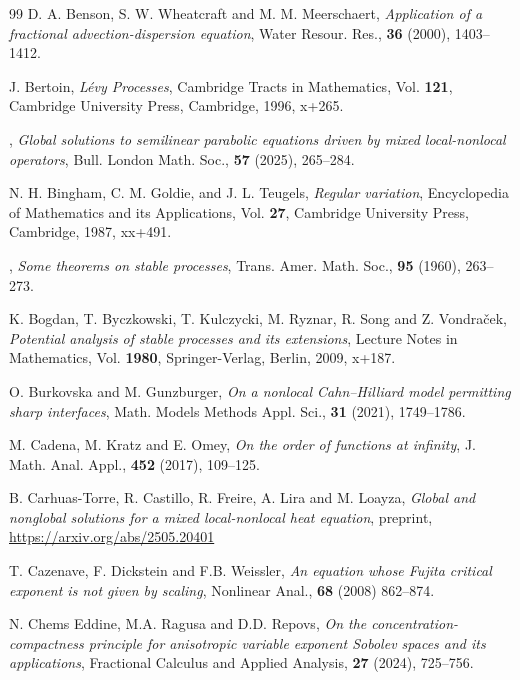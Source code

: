 \documentclass[12pt,reqno]{amsart}
\theoremstyle{plain}
\theoremstyle{definition}
\theoremstyle{remark}
\numberwithin{equation}{section}
\begin{document}
\begin{thebibliography}{99}
 D. A. Benson, S. W. Wheatcraft and M. M. Meerschaert, {\em Application of a fractional advection-dispersion equation}, Water Resour. Res., {\bf 36} (2000), 1403--1412. 

J. Bertoin, {\em Lévy Processes}, {Cambridge Tracts in Mathematics}, Vol. {\bf 121}, {Cambridge University Press, Cambridge}, {1996}, {x+265}.

, {\em Global solutions to semilinear parabolic equations driven by mixed local-nonlocal operators}, Bull. London Math. Soc., {\bf 57} (2025), 265--284. 

 {N. H. Bingham,  C. M. Goldie,  and J. L. Teugels}, {\em Regular variation}, {Encyclopedia of Mathematics and its Applications}, Vol. {\bf 27}, {Cambridge University Press, Cambridge}, {1987}, {xx+491}.

,
     {\em Some theorems on stable processes}, {Trans. Amer. Math. Soc.}, {\bf 95} (1960), {263--273}.

K. Bogdan, T. Byczkowski, T. Kulczycki, M. Ryznar, R. Song and Z. Vondraček, {\em Potential analysis of stable processes and its extensions}, {Lecture Notes in Mathematics}, Vol. {\bf 1980}, {Springer-Verlag, Berlin}, {2009}, {x+187}. 

 O. Burkovska and M. Gunzburger, {\em On a nonlocal Cahn–Hilliard model permitting sharp interfaces}, {Math. Models Methods Appl. Sci.}, {\bf 31} (2021), {1749--1786}.




 {M. Cadena, M. Kratz and E. Omey}, {\em On the order of functions at infinity}, {J. Math. Anal. Appl.}, {\bf 452} ({2017}), {109--125}.

 B. Carhuas-Torre, R. Castillo, R. Freire, A. Lira and M. Loayza, {\em Global and nonglobal solutions for a mixed local-nonlocal heat equation}, preprint, \url{https://arxiv.org/abs/2505.20401}



 T. Cazenave, F. Dickstein and F.B. Weissler, {\em An equation whose Fujita critical exponent is not given by scaling}, Nonlinear Anal., {\bf 68} (2008) 862--874.

 N. Chems Eddine, M.A. Ragusa and D.D. Repovs, {\em On the concentration-compactness
principle for anisotropic variable exponent Sobolev spaces and its applications}, Fractional
Calculus and Applied Analysis, {\bf 27} (2024), 725--756.


\end{thebibliography}
\end{document}
